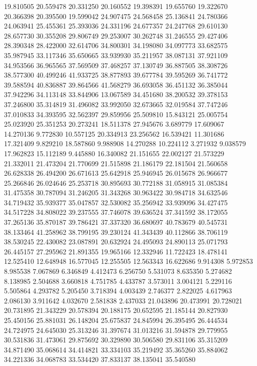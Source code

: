 19.810505
20.559478
20.331250
20.160552
19.398391
19.655760
19.322670
20.366398
20.395500
19.599042
24.907475
24.568458
25.136841
24.780366
24.063941
25.455361
25.393036
24.331196
24.677357
24.247768
29.610130
28.657730
30.355208
29.806749
29.253007
30.262748
31.246555
29.427406
28.390348
28.422000
32.614706
34.800301
34.198080
34.097773
33.682575
35.987945
33.117346
35.650665
33.939930
35.211957
38.087131
37.921109
34.953566
36.965565
37.569509
37.468257
37.130749
36.887505
38.308726
38.577300
40.499246
41.933725
38.877893
39.677784
39.595269
36.741772
39.588594
40.836887
39.864566
41.568279
36.693058
36.451132
36.385044
37.942296
34.113148
33.844906
13.067589
34.451680
38.200532
39.378153
37.246800
35.314819
31.496082
33.992050
32.673665
32.019584
37.747246
37.010833
34.393595
32.562397
29.859956
25.509810
15.843121
25.005754
25.023920
25.351253
20.273241
18.511378
27.945676
3.689779
17.609067
14.270136
9.772830
10.557125
20.334913
23.256562
16.539421
11.301686
17.321409
9.829210
18.587860
9.988908
14.270288
10.224112
3.271932
9.038579
17.962823
15.112189
9.445880
16.340082
21.151655
22.002127
21.573229
21.332011
21.473204
21.770699
21.515898
21.186179
22.181504
21.560658
26.628338
26.494200
26.671613
25.642918
25.946945
26.015678
26.966677
25.266846
26.024646
25.253718
30.895693
30.772188
31.058915
31.085384
31.475358
30.787094
31.246205
31.343268
30.963422
30.984718
34.632546
34.719432
35.939377
35.047857
32.530082
35.256942
33.939096
34.427475
34.517228
34.808022
39.237555
37.746078
39.636524
37.341592
38.172055
37.265136
35.870187
39.786421
37.337320
36.680697
40.783679
40.545731
38.133464
41.258962
38.799195
39.230124
41.343439
40.112866
38.706119
38.530245
22.430082
23.087891
20.632924
24.495093
24.890113
25.071793
26.445157
27.295962
21.891355
19.965166
12.332946
11.722423
18.478141
12.525410
12.648948
16.577045
12.255505
12.563343
16.622686
9.914308
5.972853
8.985538
7.067869
6.346849
4.412473
6.256750
5.531073
8.635350
5.274682
8.138985
2.504688
3.660818
4.751785
4.433787
3.573011
3.004121
5.229116
5.505864
4.293782
5.205450
3.718394
4.003439
2.746377
2.822025
4.617963
2.086130
3.911642
4.032670
2.581838
2.437033
21.043896
20.473991
20.728021
20.731895
21.343229
20.578394
20.188175
20.652595
21.185144
20.827930
25.450156
25.881031
26.148204
25.675837
24.845994
26.395495
26.444534
24.724975
24.645030
25.313246
31.397674
31.013216
31.594878
29.779955
30.531836
31.473061
29.875692
30.329890
30.506580
29.831106
35.315209
34.871490
35.068614
34.414821
33.334103
35.219492
35.365260
35.884062
34.221336
34.068783
33.534420
37.833137
38.135041
35.540580
